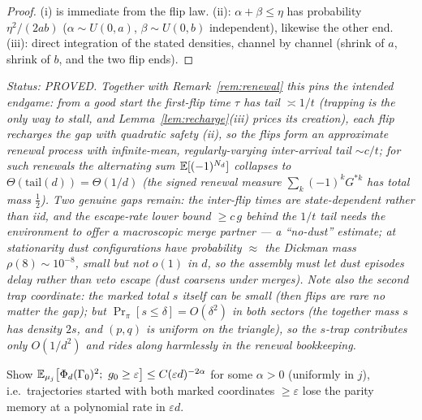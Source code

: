 \begin{proof}
(i) is immediate from the flip law.  (ii): $\alpha+\beta\le\eta$ has
probability $\eta^2/(2ab)$ ($\alpha\sim U(0,a)$, $\beta\sim U(0,b)$
independent), likewise the other end.  (iii): direct integration of
the stated densities, channel by channel (shrink of $a$, shrink of
$b$, and the two flip ends).
\end{proof}

\emph{Status: PROVED.  Together with Remark~\ref{rem:renewal} this
pins the intended endgame: from a good start the first-flip time
$\tau$ has tail $\asymp1/t$ (trapping is the only way to stall, and
Lemma~\ref{lem:recharge}(iii) prices its creation), each flip
recharges the gap with quadratic safety (ii), so the flips form an
approximate renewal process with infinite-mean, regularly-varying
inter-arrival tail $\sim c/t$; for such renewals the alternating sum
$\mathbb{E}[(-1)^{N_d}]$ collapses to $\Theta(\text{tail}(d))=\Theta(1/d)$
(the signed renewal measure $\sum_k(-1)^kG^{*k}$ has total mass
$\tfrac12$).  Two genuine gaps remain: the inter-flip times are
state-dependent rather than iid, and the escape-rate lower bound
$\ge c\,g$ behind the $1/t$ tail needs the environment to offer a
macroscopic merge partner --- a ``no-dust'' estimate; at stationarity
dust configurations have probability $\approx$ the Dickman mass
$\rho(8)\sim10^{-8}$, small but not $o(1)$ in $d$, so the assembly
must let dust episodes delay rather than veto escape (dust coarsens
under merges).  Note also the second trap coordinate: the marked total
$s$ itself can be small (then flips are rare no matter the gap); but
$\Pr_\pi[s\le\delta]=O(\delta^2)$ in both sectors (the together mass
$s$ has density $2s$, and $(p,q)$ is uniform on the triangle), so the
$s$-trap contributes only $O(1/d^2)$ and rides along harmlessly in
the renewal bookkeeping.}

\begin{problem}\label{prob:survival}
Show $\E_{\mu_j}\bigl[\Phi_d(\Gamma_0)^2;\ g_0\ge\varepsilon\bigr]\le
C(\varepsilon d)^{-2\alpha}$ for some $\alpha>0$ (uniformly in $j$),
i.e.\ trajectories started with both marked coordinates
$\ge\varepsilon$ lose the parity memory at a polynomial rate in
$\varepsilon d$.
\end{problem}

